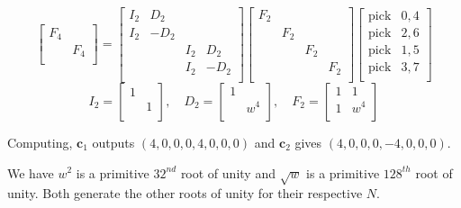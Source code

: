 \documentclass[a4paper]{article}
\begin{document}
\[
	\begin{bmatrix}
		F_{4} & \\
		 & F_{4} \\
	\end{bmatrix} = 
	\begin{bmatrix}
		I_{2} & D_{2} &  & \\
		I_{2} & -D_{2} &  & \\
		 &  & I_{2} & D_{2} \\
		 &  & I_{2} & -D_{2} \\
	\end{bmatrix}
	\begin{bmatrix}
		F_{2} &  &  & \\
		 & F_{2} &  & \\
		 &  & F_{2} & \\
		 &  &  & F_{2} \\
	\end{bmatrix}
	\begin{bmatrix}
		\text{pick} & 0, 4 \\
		\text{pick} & 2, 6 \\
		\text{pick} & 1, 5 \\
		\text{pick} & 3, 7 \\
	\end{bmatrix}
\]
\[
	I_{2} = \begin{bmatrix}
		1 & \\
		 & 1 \\
	\end{bmatrix}, \quad
	D_{2} = \begin{bmatrix}
		1 & \\
		 & w^{4} \\
	\end{bmatrix}, \quad
	F_{2} = \begin{bmatrix}
		1 & 1 \\
		1 & w^{4} \\
	\end{bmatrix}
\]

Computing, \( \pmb{c}_{1} \) outputs \( \!\left( 4,0,0,0,4,0,0,0 \right) \) and \( \pmb{c}_{2} \) gives \( \!\left( 4,0,0,0,-4,0,0,0 \right) \).

\vspace{12pt}


We have \( w^{2} \) is a primitive \( 32^{nd} \) root of unity and \( \sqrt{w} \) is a primitive \( 128^{th} \) root of unity. Both generate the other roots of unity for their respective \( N \).
\end{document}

